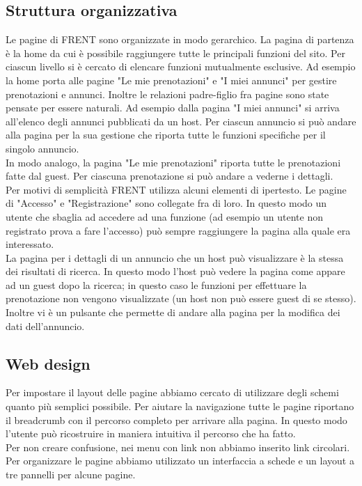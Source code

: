 \documentclass[1_relazione.tex]{subfiles}
\begin{document}
\subsection{Struttura organizzativa}
Le pagine di FRENT sono organizzate in modo gerarchico. La pagina di partenza \`{e} la home da cui \`{e} possibile raggiungere tutte le principali funzioni del sito. Per ciascun livello si \`{e} cercato di elencare funzioni mutualmente esclusive. Ad esempio la home porta alle pagine "Le mie prenotazioni" e "I miei annunci" per gestire prenotazioni e annunci. Inoltre le relazioni padre-figlio fra pagine sono state pensate per essere naturali. Ad esempio dalla pagina "I miei annunci" si arriva all'elenco degli annunci pubblicati da un host. Per ciascun annuncio si pu\`{o} andare alla pagina per la sua gestione che riporta tutte le funzioni specifiche per il singolo annuncio.\\In modo analogo, la pagina "Le mie prenotazioni" riporta tutte le prenotazioni fatte dal guest. Per ciascuna prenotazione si pu\`{o} andare a vederne i dettagli. \\
Per motivi di semplicit\`{a} FRENT utilizza alcuni elementi di ipertesto. Le pagine di "Accesso" e "Registrazione" sono collegate fra di loro. In questo modo un utente che sbaglia ad accedere ad una funzione (ad esempio un utente non registrato prova a fare l'accesso) può sempre raggiungere la pagina alla quale era interessato.\\
La pagina per i dettagli di un annuncio che un host pu\`{o} visualizzare \`{e} la stessa dei risultati di ricerca. In questo modo l'host pu\`{o} vedere la pagina come appare ad un guest dopo la ricerca; in questo caso le funzioni per effettuare la prenotazione non vengono visualizzate (un host non pu\`{o} essere guest di se stesso). Inoltre vi \`{e} un pulsante che permette di andare alla pagina per la modifica dei dati dell'annuncio.

\subsection{Web design}
Per impostare il layout delle pagine abbiamo cercato di utilizzare degli schemi quanto pi\`{u} semplici possibile. Per aiutare la navigazione tutte le pagine riportano il breadcrumb con il percorso completo per arrivare alla pagina. In questo modo l'utente pu\`{o} ricostruire in maniera intuitiva il percorso che ha fatto.\\ Per non creare confusione, nei menu con link non abbiamo inserito link circolari. \\
Per organizzare le pagine abbiamo utilizzato un interfaccia a schede e un layout a tre pannelli per alcune pagine.
\end{document}
